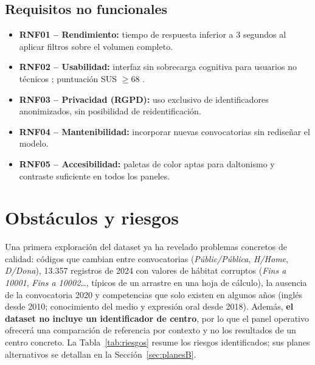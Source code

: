 \documentclass[12pt, a4paper, oneside]{report}
\begin{document}
\subsection{Requisitos no funcionales}
\begin{itemize}
    \item \textbf{RNF01 -- Rendimiento:} tiempo de respuesta inferior a 3 segundos al aplicar filtros sobre el volumen completo.
    \item \textbf{RNF02 -- Usabilidad:} interfaz sin sobrecarga cognitiva para usuarios no técnicos \cite{few2006information}; puntuación SUS $\geq 68$ \cite{brooke1996sus}.
    \item \textbf{RNF03 -- Privacidad (RGPD):} uso exclusivo de identificadores anonimizados, sin posibilidad de reidentificación.
    \item \textbf{RNF04 -- Mantenibilidad:} incorporar nuevas convocatorias sin rediseñar el modelo.
    \item \textbf{RNF05 -- Accesibilidad:} paletas de color aptas para daltonismo y contraste suficiente en todos los paneles.
\end{itemize}

\section{Obstáculos y riesgos}
\label{sec:riesgos}
Una primera exploración del dataset ya ha revelado problemas concretos de calidad: códigos que cambian entre convocatorias (\textit{Públic/Pública}, \textit{H/Home}, \textit{D/Dona}), 13.357 registros de 2024 con valores de hábitat corruptos (\textit{Fins a 10001}, \textit{Fins a 10002}\ldots, típicos de un arrastre en una hoja de cálculo), la ausencia de la convocatoria 2020 y competencias que solo existen en algunos años (inglés desde 2010; conocimiento del medio y expresión oral desde 2018). Además, \textbf{el dataset no incluye un identificador de centro}, por lo que el panel operativo ofrecerá una comparación de referencia por contexto y no los resultados de un centro concreto. La Tabla~\ref{tab:riesgos} resume los riesgos identificados; sus planes alternativos se detallan en la Sección~\ref{sec:planesB}.
\end{document}
